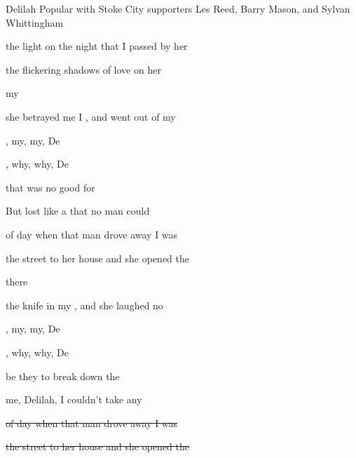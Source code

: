 \begin{SBSong}{Delilah}
  {Popular with Stoke City supporters}
  {Les Reed, Barry Mason, and Sylvan Whittingham}
  \begin{SBVerse}
     the light on the night that I passed by her 

     the flickering shadows of love on her 

      my 
 
     she betrayed me I , and went out of my  
  \end{SBVerse}
  \begin{SBVerse}
    , my, my, De

    , why, why, De

      that  was no good for 

    But  lost like a  that no man could  
  \end{SBVerse}
  \begin{SBVerse}
     of day when that man drove away I was 

     the street to her house and she opened the 

      there 

     the knife in my , and she laughed no  
  \end{SBVerse}
  \begin{SBVerse}
    , my, my, De

    , why, why, De

     be they  to break down the 

     me, Delilah, I  couldn't take any  
  \end{SBVerse}
  \begin{SBVerse}
    \ifChordBk
      \sout{ of day when that man drove away I was }

      \sout{ the street to her house and she opened the }
    \fi
    

\end{SBVerse}
\end{SBSong}
